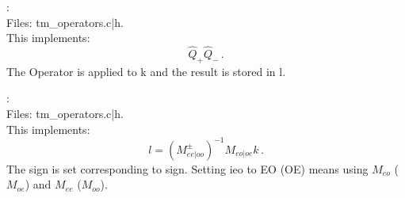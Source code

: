 :\\
Files: {\ttfamily tm\_operators.c|h}.\\
This implements:
\[
\hat Q_{+} \hat Q_{-}\, .
\]
The Operator is applied to {\ttfamily k} and the result is stored in
{\ttfamily l}.

:\\
Files:  {\ttfamily tm\_operators.c|h}.\\
This implements:
\[
l = (M_{ee|oo}^\pm)^{-1} M_{eo|oe} k\, .
\]
The sign is set corresponding to {\ttfamily sign}. Setting {\ttfamily
  ieo} to {\ttfamily EO} ({\ttfamily OE}) means using $M_{eo}$
($M_{oe}$) and $M_{ee}$ ($M_{oo}$).


